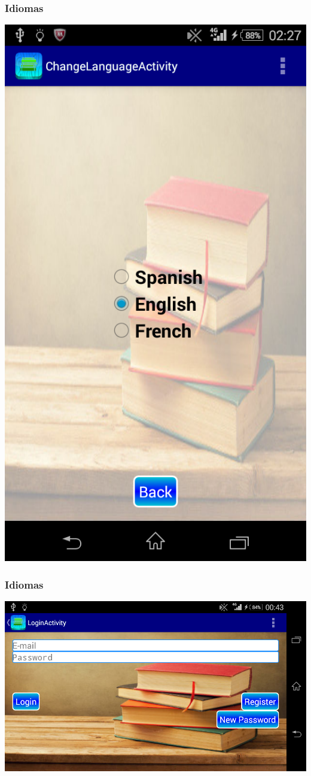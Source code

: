 \begin{frame}
	\frametitle{Idiomas}
	\begin{center}
		\includegraphics[width=0.3\linewidth]{Images/App/ChangeLanguaje}
	\end{center}
\end{frame}


\begin{frame}
	\frametitle{Idiomas}
	
\end{frame}


\begin{frame}
	\begin{center}
		\includegraphics[width=0.7\linewidth]{Images/App/loginLand}
	\end{center}
\end{frame}